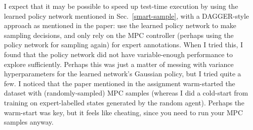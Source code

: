 \documentclass{article}
\begin{document}
I expect that it may be possible to speed up test-time execution by using the learned policy network mentioned in Sec.~\ref{smart-sample}, with a DAGGER-style approach as mentioned in the paper: use the learned policy network to make sampling decisions, and only rely on the MPC controller (perhaps using the policy network for sampling again) for expert annotations. When I tried this, I found that the policy network did not have variable-enough performance to explore sufficiently. Perhaps this was just a matter of messing with variance hyperparameters for the learned network's Gaussian policy, but I tried quite a few. I noticed that the paper mentioned in the assignment warm-started the dataset with (randomly-sampled) MPC samples (whereas I did a cold-start from training on expert-labelled states generated by the random agent). Perhaps the warm-start was key, but it feels like cheating, since you need to run your MPC samples anyway.
\end{document}
